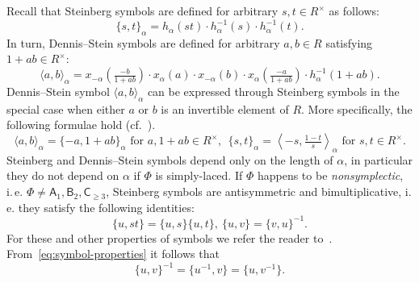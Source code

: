 \documentclass[10pt,a4paper,twoside]{article}
\theoremstyle{remark}
\theoremstyle{definition}
\numberwithin{lemma}{section}
\numberwithin{prop}{section}
\numberwithin{corollary}{section}
\numberwithin{externaltheorem}{section}
\newcommand{\rA}{\mathsf{A}}
\newcommand{\rB}{\mathsf{B}}
\newcommand{\rC}{\mathsf{C}}
\numberwithin{equation}{section}
\begin{document}
Recall that Steinberg symbols are defined for arbitrary $s, t \in R^\times$ as follows:
\begin{equation} \label{eq:steinberg} \{ s, t \}_\alpha = h_\alpha(st) \cdot h_\alpha^{-1}(s) \cdot h_\alpha^{-1}(t). \end{equation}
In turn, Dennis--Stein symbols are defined for arbitrary $a, b\in R$ satisfying $1 + ab \in R^\times$:
\begin{equation} \label{eq:dennis-stein}  \langle a,b \rangle _ \alpha = x_{-\alpha}\left(\tfrac{- b}{1 + ab}\right) \cdot x_{\alpha}(a) \cdot x_{-\alpha}(b) \cdot x_{\alpha}\left(\tfrac{- a}{1+ab}\right) \cdot h_{\alpha}^{-1}(1 + ab). \end{equation} 
Dennis--Stein symbol $\langle a, b \rangle_\alpha$ can be expressed through Steinberg symbols in the special case when either $a$ or $b$ is an invertible element of $R$. More specifically, the following formulae hold (cf.~\cite[p.~250]{DS73}).
\begin{equation} \label{DS-S-relationship} \langle a, b \rangle_\alpha = \{-a, 1+ab\}_\alpha\text{ for } a, 1+ab\in R^\times,\ \
 \{ s, t \}_\alpha = \left\langle -s, \tfrac{1 - t}{s} \right\rangle_\alpha\text{ for } s, t\in R^\times. \end{equation}
Steinberg and Dennis--Stein symbols depend only on the length of $\alpha$, in particular they do not depend on $\alpha$ if $\Phi$ is simply-laced. If $\Phi$ happens to be {\it nonsymplectic}, i.\,e. $\Phi \neq \rA_1, \rB_2, \rC_{\geq 3}$, Steinberg symbols are antisymmetric and bimultiplicative, i.\,e. they satisfy the following identities: \begin{equation} \label{eq:symbol-properties} \{ u, st \} = \{ u, s\} \{ u, t \}, \ \{ u, v \} = \{ v, u\}^{-1}. \end{equation}
For these and other properties of symbols we refer the reader to~\cite{DS73}.
From~\eqref{eq:symbol-properties} it follows that
\begin{equation} \label{eq:symbol-inverse} \{u, v\}^{-1} = \{u^{-1}, v\} = \{u, v^{-1}\}. \end{equation}
\end{document}

